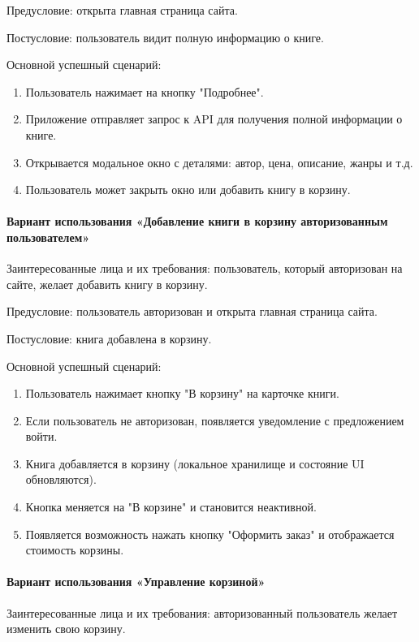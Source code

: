 Предусловие: открыта главная страница сайта.

Постусловие: пользователь видит полную информацию о книге.

Основной успешный сценарий:

\begin{enumerate}
	\item Пользователь нажимает на кнопку "Подробнее".
	\item Приложение отправляет запрос к API для получения полной информации о книге.
	\item Открывается модальное окно с деталями: автор, цена, описание, жанры и т.д.
	\item Пользователь может закрыть окно или добавить книгу в корзину.
\end{enumerate}


\paragraph{Вариант использования «Добавление книги в корзину авторизованным пользователем»}

Заинтересованные лица и их требования: пользователь, который авторизован на сайте, желает добавить книгу в корзину.

Предусловие: пользователь авторизован и открыта главная страница сайта.

Постусловие: книга добавлена в корзину.

Основной успешный сценарий:

\begin{enumerate}
	\item Пользователь нажимает кнопку "В корзину" на карточке книги.
	\item Если пользователь не авторизован, появляется уведомление с предложением войти.
	\item Книга добавляется в корзину (локальное хранилище и состояние UI обновляются).
	\item Кнопка меняется на "В корзине" и становится неактивной.
	\item Появляется возможность нажать кнопку "Оформить заказ" и отображается стоимость корзины.
\end{enumerate}

\paragraph{Вариант использования «Управление корзиной»}

Заинтересованные лица и их требования: авторизованный пользователь желает изменить свою корзину.


